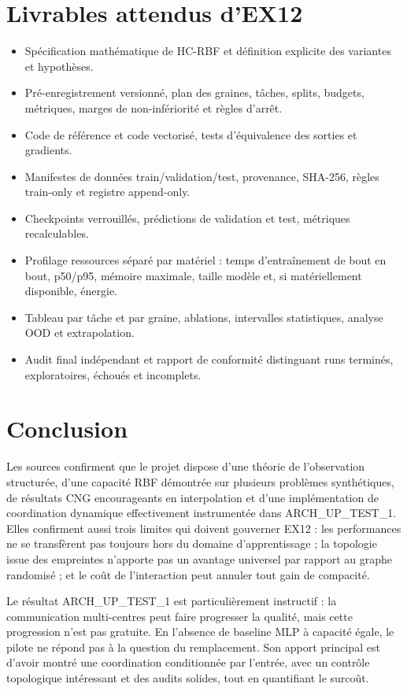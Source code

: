 \documentclass[11pt,a4paper]{article}
\newcommand{\HC}{\textsc{HC-RBF}}
\begin{document}
\section{Livrables attendus d'EX12}

\begin{itemize}
  \item Spécification mathématique de \HC{} et définition explicite des variantes et hypothèses.
  \item Pré-enregistrement versionné, plan des graines, tâches, splits, budgets, métriques, marges de non-infériorité et règles d'arrêt.
  \item Code de référence et code vectorisé, tests d'équivalence des sorties et gradients.
  \item Manifestes de données train/validation/test, provenance, SHA-256, règles train-only et registre append-only.
  \item Checkpoints verrouillés, prédictions de validation et test, métriques recalculables.
  \item Profilage ressources séparé par matériel : temps d'entraînement de bout en bout, p50/p95, mémoire maximale, taille modèle et, si matériellement disponible, énergie.
  \item Tableau par tâche et par graine, ablations, intervalles statistiques, analyse OOD et extrapolation.
  \item Audit final indépendant et rapport de conformité distinguant runs terminés, exploratoires, échoués et incomplets.
\end{itemize}

\section{Conclusion}

Les sources confirment que le projet dispose d'une théorie de l'observation structurée, d'une capacité RBF démontrée sur plusieurs problèmes synthétiques, de résultats CNG encourageants en interpolation et d'une implémentation de coordination dynamique effectivement instrumentée dans ARCH\_UP\_TEST\_1. Elles confirment aussi trois limites qui doivent gouverner EX12 : les performances ne se transfèrent pas toujours hors du domaine d'apprentissage ; la topologie issue des empreintes n'apporte pas un avantage universel par rapport au graphe randomisé ; et le coût de l'interaction peut annuler tout gain de compacité.

Le résultat ARCH\_UP\_TEST\_1 est particulièrement instructif : la communication multi-centres peut faire progresser la qualité, mais cette progression n'est pas gratuite. En l'absence de baseline MLP à capacité égale, le pilote ne répond pas à la question du remplacement. Son apport principal est d'avoir montré une coordination conditionnée par l'entrée, avec un contrôle topologique intéressant et des audits solides, tout en quantifiant le surcoût.
\end{document}
